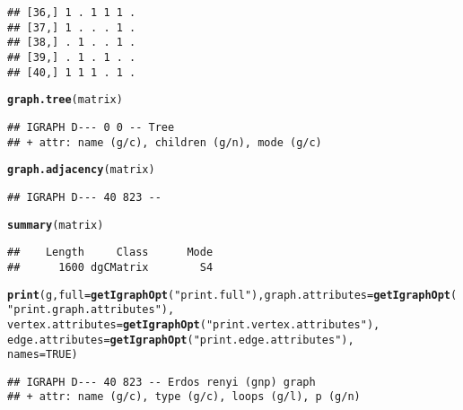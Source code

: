 \documentclass{article}\usepackage[]{graphicx}\usepackage[]{color}
\makeatletter
\newcommand{\hlnum}[1]{\textcolor[rgb]{0.686,0.059,0.569}{#1}}%
\newcommand{\hlstr}[1]{\textcolor[rgb]{0.192,0.494,0.8}{#1}}%
\newcommand{\hlstd}[1]{\textcolor[rgb]{0.345,0.345,0.345}{#1}}%
\newcommand{\hlkwc}[1]{\textcolor[rgb]{0.333,0.667,0.333}{#1}}%
\newcommand{\hlkwd}[1]{\textcolor[rgb]{0.737,0.353,0.396}{\textbf{#1}}}%
\newenvironment{kframe}{%
 \def\at@end@of@kframe{}%
 \ifinner\ifhmode%
  \def\at@end@of@kframe{\end{minipage}}%
  \begin{minipage}{\columnwidth}%
 \fi\fi%
 \def\FrameCommand##1{\hskip\@totalleftmargin \hskip-\fboxsep
 \colorbox{shadecolor}{##1}\hskip-\fboxsep
     \hskip-\linewidth \hskip-\@totalleftmargin \hskip\columnwidth}%
 \MakeFramed {\advance\hsize-\width
   \@totalleftmargin\z@ \linewidth\hsize
   \@setminipage}}%
 {\par\unskip\endMakeFramed%
 \at@end@of@kframe}
\newenvironment{knitrout}{}{} %
\makeatother
\begin{document}
\begin{knitrout}
\begin{kframe}
\begin{verbatim}
## [36,] 1 . 1 1 1 .
## [37,] 1 . . . 1 .
## [38,] . 1 . . 1 .
## [39,] . 1 . 1 . .
## [40,] 1 1 1 . 1 .
\end{verbatim}
\begin{alltt}
\hlkwd{graph.tree}\hlstd{(matrix)}
\end{alltt}
\begin{verbatim}
## IGRAPH D--- 0 0 -- Tree
## + attr: name (g/c), children (g/n), mode (g/c)
\end{verbatim}
\begin{alltt}
\hlkwd{graph.adjacency}\hlstd{(matrix)}
\end{alltt}
\begin{verbatim}
## IGRAPH D--- 40 823 --
\end{verbatim}
\begin{alltt}
\hlkwd{summary}\hlstd{(matrix)}
\end{alltt}
\begin{verbatim}
##    Length     Class      Mode 
##      1600 dgCMatrix        S4
\end{verbatim}
\begin{alltt}
\hlkwd{print}\hlstd{(g,} \hlkwc{full} \hlstd{=} \hlkwd{getIgraphOpt}\hlstd{(}\hlstr{"print.full"}\hlstd{),} \hlkwc{graph.attributes} \hlstd{=} \hlkwd{getIgraphOpt}\hlstd{(}\hlstr{"print.graph.attributes"}\hlstd{),}
    \hlkwc{vertex.attributes} \hlstd{=} \hlkwd{getIgraphOpt}\hlstd{(}\hlstr{"print.vertex.attributes"}\hlstd{),}
    \hlkwc{edge.attributes} \hlstd{=} \hlkwd{getIgraphOpt}\hlstd{(}\hlstr{"print.edge.attributes"}\hlstd{),}
    \hlkwc{names} \hlstd{=} \hlnum{TRUE}\hlstd{)}
\end{alltt}
\begin{verbatim}
## IGRAPH D--- 40 823 -- Erdos renyi (gnp) graph
## + attr: name (g/c), type (g/c), loops (g/l), p (g/n)
\end{verbatim}
\end{kframe}
\end{knitrout}
\end{document}
